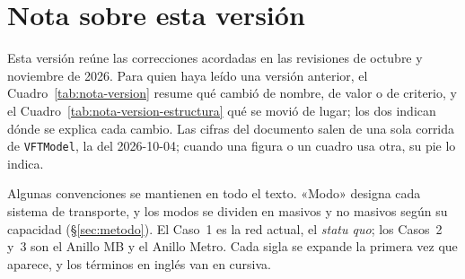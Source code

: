 \chapter*{Nota sobre esta versión}

Esta versión reúne las correcciones acordadas en las revisiones de octubre y
noviembre de 2026. Para quien haya leído una versión anterior, el
Cuadro~\ref{tab:nota-version} resume qué cambió de nombre, de valor o de
criterio, y el Cuadro~\ref{tab:nota-version-estructura} qué se movió de lugar;
los dos indican dónde se explica cada cambio. Las cifras del documento salen de una
sola corrida de \texttt{VFTModel}, la del 2026-10-04; cuando una figura o un
cuadro usa otra, su pie lo indica.

Algunas convenciones se mantienen en todo el texto. «Modo» designa cada
sistema de transporte, y los modos se dividen en masivos y no masivos según su
capacidad (§\ref{sec:metodo}). El Caso~1 es la red actual, el \textit{statu
quo}; los Casos~2 y~3 son el Anillo MB y el Anillo Metro. Cada sigla se
expande la primera vez que aparece, y los términos en inglés van en cursiva.

